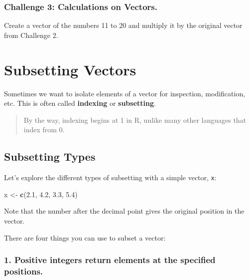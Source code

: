 \documentclass[
]{book}
\newenvironment{Shaded}{\begin{snugshade}}{\end{snugshade}}
\newcommand{\FloatTok}[1]{\textcolor[rgb]{0.00,0.00,0.81}{#1}}
\newcommand{\KeywordTok}[1]{\textcolor[rgb]{0.13,0.29,0.53}{\textbf{#1}}}
\newcommand{\NormalTok}[1]{#1}
\newcommand{\StringTok}[1]{\textcolor[rgb]{0.31,0.60,0.02}{#1}}
\begin{document}
\hypertarget{challenge-3-calculations-on-vectors.}{%
\subsubsection*{Challenge 3: Calculations on Vectors.}\label{challenge-3-calculations-on-vectors.}}

Create a vector of the numbers 11 to 20 and multiply it by the original vector from Challenge 2.

\hypertarget{subsetting-vectors}{%
\section{Subsetting Vectors}\label{subsetting-vectors}}

Sometimes we want to isolate elements of a vector for inspection, modification, etc. This is often called \textbf{indexing} or \textbf{subsetting}.

\begin{quote}
By the way, indexing begins at 1 in R, unlike many other languages that index from 0.
\end{quote}

\hypertarget{subsetting-types}{%
\subsection{Subsetting Types}\label{subsetting-types}}

Let's explore the different types of subsetting with a simple vector, \texttt{x}:

\begin{Shaded}
\begin{Highlighting}[]
\NormalTok{x <-}\StringTok{ }\KeywordTok{c}\NormalTok{(}\FloatTok{2.1}\NormalTok{, }\FloatTok{4.2}\NormalTok{, }\FloatTok{3.3}\NormalTok{, }\FloatTok{5.4}\NormalTok{)}
\end{Highlighting}
\end{Shaded}

Note that the number after the decimal point gives the original position in the vector.

There are four things you can use to subset a vector:

\hypertarget{positive-integers-return-elements-at-the-specified-positions.}{%
\subsubsection*{\texorpdfstring{1. \textbf{Positive integers} return elements at the specified positions.}{1. Positive integers return elements at the specified positions.}}\label{positive-integers-return-elements-at-the-specified-positions.}}
\end{document}
